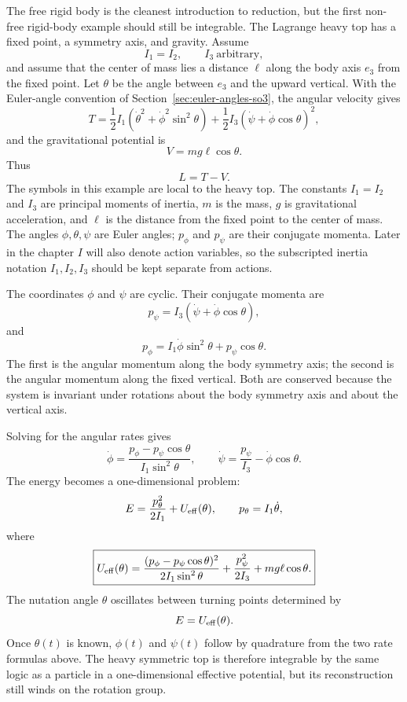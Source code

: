 The free rigid body is the cleanest introduction to reduction, but the first
non-free rigid-body example should still be integrable.  The Lagrange heavy top
has a fixed point, a symmetry axis, and gravity.  Assume
\[
  I_1=I_2,\qquad I_3\ \text{arbitrary},
\]
and assume that the center of mass lies a distance \(\ell\) along the body
axis \(e_3\) from the fixed point.  Let \(\theta\) be the angle between \(e_3\)
and the upward vertical.  With the Euler-angle convention of
Section~\ref{sec:euler-angles-so3}, the angular velocity gives
\[
  T
  =
  \frac12 I_1(\dot\theta^2+\dot\phi^2\sin^2\theta)
  +
  \frac12 I_3(\dot\psi+\dot\phi\cos\theta)^2,
\]
and the gravitational potential is
\[
  V=mg\ell\cos\theta .
\]
Thus
\[
  L=T-V.
\]
The symbols in this example are local to the heavy top.  The constants
\(I_1=I_2\) and \(I_3\) are principal moments of inertia, \(m\) is the mass,
\(g\) is gravitational acceleration, and \(\ell\) is the distance from the
fixed point to the center of mass.  The angles \(\phi,\theta,\psi\) are Euler
angles; \(p_\phi\) and \(p_\psi\) are their conjugate momenta.  Later in the
chapter \(I\) will also denote action variables, so the subscripted inertia
notation \(I_1,I_2,I_3\) should be kept separate from actions.

The coordinates \(\phi\) and \(\psi\) are cyclic.  Their conjugate momenta are
\[
  p_\psi=I_3(\dot\psi+\dot\phi\cos\theta),
\]
and
\[
  p_\phi
  =
  I_1\dot\phi\sin^2\theta+p_\psi\cos\theta .
\]
The first is the angular momentum along the body symmetry axis; the second is
the angular momentum along the fixed vertical.  Both are conserved because the
system is invariant under rotations about the body symmetry axis and about the
vertical axis.

Solving for the angular rates gives
\[
  \dot\phi
  =
  \frac{p_\phi-p_\psi\cos\theta}{I_1\sin^2\theta},
  \qquad
  \dot\psi
  =
  \frac{p_\psi}{I_3}-\dot\phi\cos\theta .
\]
The energy becomes a one-dimensional problem:
\[
  E
  =
  \frac{p_\theta^2}{2I_1}
  +
  U_{\rm eff}(\theta),
  \qquad
  p_\theta=I_1\dot\theta,
\]
where
\[
  \boxed{
  U_{\rm eff}(\theta)
  =
  \frac{(p_\phi-p_\psi\cos\theta)^2}{2I_1\sin^2\theta}
  +
  \frac{p_\psi^2}{2I_3}
  +
  mg\ell\cos\theta .
  }
\]
The nutation angle \(\theta\) oscillates between turning points determined by
\[
  E=U_{\rm eff}(\theta).
\]
Once \(\theta(t)\) is known, \(\phi(t)\) and \(\psi(t)\) follow by quadrature
from the two rate formulas above.  The heavy symmetric top is therefore
integrable by the same logic as a particle in a one-dimensional effective
potential, but its reconstruction still winds on the rotation group.

